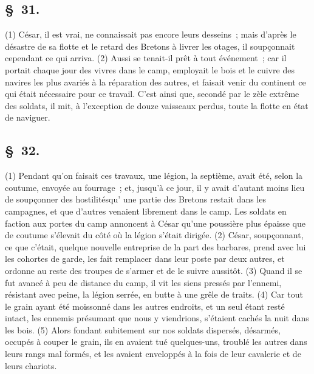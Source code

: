 \documentclass[french,twoside]{book} %
\begin{document}
\subsection[{§ 31.}]{ \textsc{§ 31.} }
\noindent (1) César, il est vrai, ne connaissait pas encore leurs desseins ; mais d’après le désastre de sa flotte et le retard des Bretons à livrer les otages, il soupçonnait cependant ce qui arriva. (2) Aussi se tenait-il prêt à tout événement ; car il portait chaque jour des vivres dans le camp, employait le bois et le cuivre des navires les plus avariés à la réparation des autres, et faisait venir du continent ce qui était nécessaire pour ce travail. C'est ainsi que, secondé par le zèle extrême des soldats, il mit, à l’exception de douze vaisseaux perdus, toute la flotte en état de naviguer.
\subsection[{§ 32.}]{ \textsc{§ 32.} }
\noindent (1) Pendant qu’on faisait ces travaux, une légion, la septième, avait été, selon la coutume, envoyée au fourrage ; et, jusqu’à ce jour, il y avait d’autant moins lieu de soupçonner des hostilitésqu’ une partie des Bretons restait dans les campagnes, et que d’autres venaient librement dans le camp. Les soldats en faction aux portes du camp annoncent à César qu’une poussière plus épaisse que de coutume s’élevait du côté où la légion s’était dirigée. (2) César, soupçonnant, ce que c’était, quelque nouvelle entreprise de la part des barbares, prend avec lui les cohortes de garde, les fait remplacer dans leur poste par deux autres, et ordonne au reste des troupes de s’armer et de le suivre aussitôt. (3) Quand il se fut avancé à peu de distance du camp, il vit les siens pressés par l’ennemi, résistant avec peine, la légion serrée, en butte à une grêle de traits. (4) Car tout le grain ayant été moissonné dans les autres endroits, et un seul étant resté intact, les ennemis présumant que nous y viendrions, s’étaient cachés la nuit dans les bois. (5) Alors fondant subitement sur nos soldats dispersés, désarmés, occupés à couper le grain, ils en avaient tué quelques-uns, troublé les autres dans leurs rangs mal formés, et les avaient enveloppés à la fois de leur cavalerie et de leurs chariots.
\end{document}
